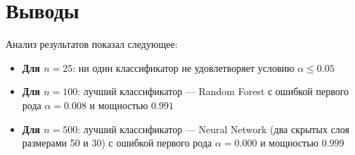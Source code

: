 \documentclass[12pt,a4paper]{article}
\begin{document}
\section{Выводы}

Анализ результатов показал следующее:

\begin{itemize}
    \item \textbf{Для $n=25$}: ни один классификатор не удовлетворяет условию $\alpha \leq 0.05$
    \item \textbf{Для $n=100$}: лучший классификатор --- Random Forest с ошибкой первого рода $\alpha = 0.008$ и мощностью $0.991$
    \item \textbf{Для $n=500$}: лучший классификатор --- Neural Network (два скрытых слоя размерами 50 и 30) с ошибкой первого рода $\alpha = 0.000$ и мощностью $0.999$
\end{itemize}
\end{document}
